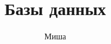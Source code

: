 \documentclass[13pt,a4paper]{scrartcl}
\begin{document}
\title{Базы данных}
\author{Миша}
\maketitle	








\end{document}
